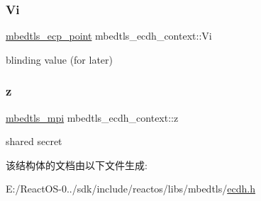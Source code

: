 \subsubsection{\texorpdfstring{Vi}{Vi}}
{\footnotesize\ttfamily \hyperlink{structmbedtls__ecp__point}{mbedtls\+\_\+ecp\+\_\+point} mbedtls\+\_\+ecdh\+\_\+context\+::\+Vi}

blinding value (for later) \mbox{\label{structmbedtls__ecdh__context_abfd253d99f23c57cbeafc41985db764c}} 
\subsubsection{\texorpdfstring{z}{z}}
{\footnotesize\ttfamily \hyperlink{structmbedtls__mpi}{mbedtls\+\_\+mpi} mbedtls\+\_\+ecdh\+\_\+context\+::z}

shared secret 

该结构体的文档由以下文件生成\+:\begin{DoxyCompactItemize}
\item 
E\+:/\+React\+O\+S-\/0../sdk/include/reactos/libs/mbedtls/\hyperlink{ecdh_8h}{ecdh.\+h}\end{DoxyCompactItemize}
